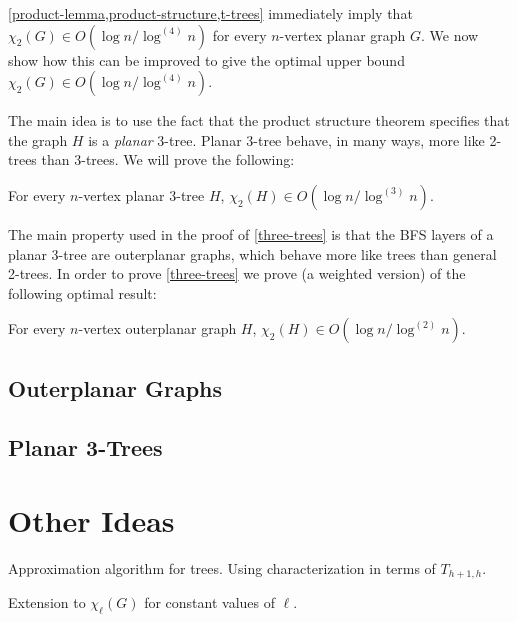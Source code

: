 \documentclass[kpfonts]{patmorin}
\newcommand{\uqs}{\chi_2}
\theoremstyle{named}
\begin{document}
\cref{product-lemma,product-structure,t-trees} immediately imply that $\uqs(G)\in O(\log n/\log^{(4)} n)$ for every $n$-vertex planar graph $G$.  We now show how this can be improved to give the optimal upper bound
$\uqs(G)\in O(\log n/\log^{(4)} n)$.

The main idea is to use the fact that the product structure theorem specifies that the graph $H$ is a \emph{planar} 3-tree.  Planar 3-tree behave, in many ways, more like 2-trees than $3$-trees.  We will prove the following:

\begin{thm}\label{three-trees}
    For every $n$-vertex planar $3$-tree $H$, $\uqs(H)\in O(\log n/\log^{(3)} n)$.
\end{thm}

The main property used in the proof of \cref{three-trees} is that the BFS layers of a planar 3-tree are outerplanar graphs, which behave more like trees than general 2-trees.  In order to prove \cref{three-trees} we prove (a weighted version) of the following optimal result:

\begin{thm}
For every $n$-vertex outerplanar graph $H$, $\uqs(H)\in O(\log n/\log^{(2)} n)$.    
\end{thm}

\subsection{Outerplanar Graphs}


\subsection{Planar 3-Trees}


\section{Other Ideas}

Approximation algorithm for trees.  Using characterization in terms of $T_{h+1,h}$.

Extension to $\chi_\ell(G)$ for constant values of $\ell$.




\end{document}
